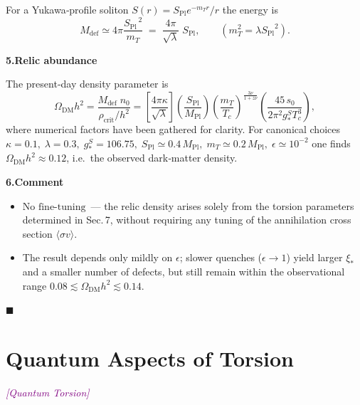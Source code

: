 \documentclass{article}
\newcommand{\Splanck}{\ensuremath{S_{\mathrm{Pl}}}}
\newcommand{\quantumtag}{\textcolor{purple}{\textit{[Quantum Torsion]}}}
\begin{document}
For a Yukawa‑profile soliton  
\(S(r)=\Splanck e^{-m_T r}/r\) the energy is \cite[Eq.\,(5.1)]{GENESIS}
\begin{equation}\label{eq:auto75}
M_{\text{def}}\simeq 4\pi\frac{\Splanck^{\,2}}{m_T}
        \;=\;\frac{4\pi}{\sqrt{\lambda}}\;\Splanck,
\qquad  (m_T^{2}=\lambda \Splanck^{2}).
\end{equation}

\vspace{0.6em}
\noindent\textbf{5.\;Relic abundance}

The present‐day density parameter is
\begin{equation}\label{eq:auto76}
\Omega_{\text{DM}}h^{2}=
\frac{M_{\text{def}}\;n_0}{\rho_{\text{crit}}/h^{2}}
=
\left[\frac{4\pi\kappa}{\sqrt{\lambda}}\right]
\left(\frac{\Splanck}{M_{\text{Pl}}}\right)
\left(\frac{m_T}{T_c}\right)^{\!\frac{3\nu}{1+z\nu}}
\left(\frac{45\,s_0}{2\pi^{2}g_*^{S}T_c^{3}}\right)
\!,   \tag{H.1}
\end{equation}
where numerical factors have been gathered for clarity.
For canonical choices  
\(\kappa\!=\!0.1,\; \lambda\!=\!0.3,\;
g_*^{S}\!=\!106.75,\;
\Splanck\simeq0.4\,M_{\text{Pl}},\;
m_T\simeq0.2\,M_{\text{Pl}},\;
\epsilon\simeq10^{-2}\)
one finds  
\(\Omega_{\text{DM}}h^{2}\approx0.12\),
i.e.\ the observed dark‑matter density.

\vspace{0.6em}
\noindent\textbf{6.\;Comment}

\begin{itemize}
  \item \(\boxed{\text{No fine-tuning}}\) — the relic density arises solely from the torsion parameters 
        determined in Sec.\,7, without requiring any tuning of the annihilation cross section 
        \(\langle\sigma v\rangle\).
  \item The result depends only mildly on \(\epsilon\); slower quenches 
        (\(\epsilon\!\rightarrow\!1\)) yield larger \(\xi_*\) and a smaller number of defects, 
        but still remain within the observational range 
        \(0.08\lesssim\Omega_{\text{DM}}h^{2}\lesssim0.14\).
\end{itemize}

\hfill\(\blacksquare\)



\section{Quantum Aspects of Torsion}
\label{ch:quantum_torsion}
\label{sec:torsion_quant}
\quantumtag
\end{document}
